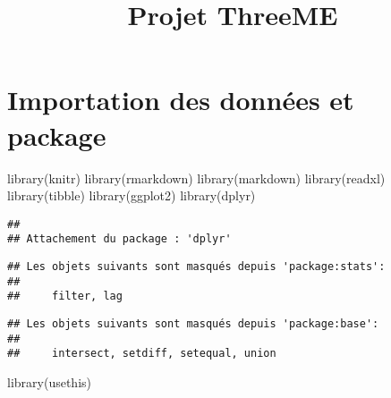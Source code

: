 \documentclass[
]{article}
\title{Projet ThreeME}
\author{}
\date{\vspace{-2.5em}}
\newenvironment{Shaded}{\begin{snugshade}}{\end{snugshade}}
\newcommand{\FunctionTok}[1]{\textcolor[rgb]{0.00,0.00,0.00}{#1}}
\newcommand{\NormalTok}[1]{#1}
\begin{document}
\maketitle

\hypertarget{importation-des-donnuxe9es-et-package}{%
\section{Importation des données et
package}\label{importation-des-donnuxe9es-et-package}}

\begin{Shaded}
\begin{Highlighting}[]
\FunctionTok{library}\NormalTok{(knitr) }
\FunctionTok{library}\NormalTok{(rmarkdown) }
\FunctionTok{library}\NormalTok{(markdown) }
\FunctionTok{library}\NormalTok{(readxl)}
\FunctionTok{library}\NormalTok{(tibble)}
\FunctionTok{library}\NormalTok{(ggplot2)}
\FunctionTok{library}\NormalTok{(dplyr)}
\end{Highlighting}
\end{Shaded}

\begin{verbatim}
## 
## Attachement du package : 'dplyr'
\end{verbatim}

\begin{verbatim}
## Les objets suivants sont masqués depuis 'package:stats':
## 
##     filter, lag
\end{verbatim}

\begin{verbatim}
## Les objets suivants sont masqués depuis 'package:base':
## 
##     intersect, setdiff, setequal, union
\end{verbatim}

\begin{Shaded}
\begin{Highlighting}[]
\FunctionTok{library}\NormalTok{(usethis)}
\end{Highlighting}
\end{Shaded}
\end{document}
